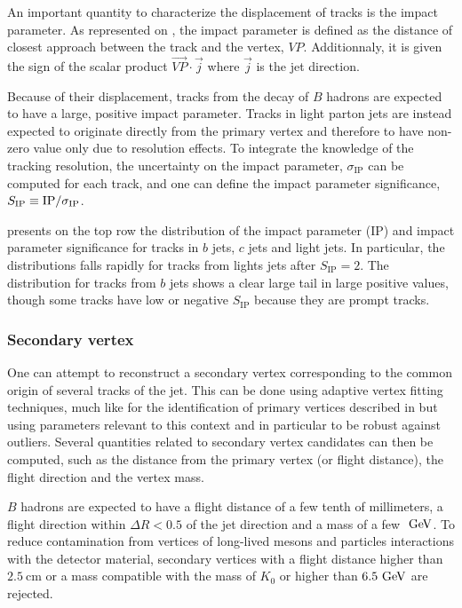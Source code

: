     An important quantity to characterize the displacement of tracks is the impact parameter.
    As represented on , the impact parameter is defined
    as the distance of closest approach between the track and the vertex, $VP$. Additionnaly,
    it is given the sign of the scalar product $\vec{VP} \cdot \vec{j}$ where $\vec{j}$ is
    the jet direction.

    Because of their displacement, tracks from the decay of $B$ hadrons are expected to
    have a large, positive impact parameter. Tracks in light parton jets are instead expected
    to originate directly from the primary vertex and therefore to have non-zero value
    only due to resolution effects. To integrate the knowledge of the tracking resolution,
    the uncertainty on the impact parameter, $\sigma_\text{IP}$ can be computed for each
    track, and one can define the impact parameter significance, $S_\text{IP} \equiv
    \text{IP}/\sigma_\text{IP}$.

     presents on the top row the distribution of the
    impact parameter (IP) and impact parameter significance for tracks in $b$ jets, $c$
    jets and light jets. In particular, the distributions falls rapidly for tracks from
    lights jets after $S_\text{IP} = 2$. The distribution for tracks from $b$ jets shows
    a clear large tail in large positive values, though some tracks have low or negative
    $S_\text{IP}$ because they are prompt tracks.

    \subsubsection{Secondary vertex}

    One can attempt to reconstruct a secondary vertex corresponding to the common origin
    of several tracks of the jet. This can be done using adaptive vertex fitting techniques,
    much like for the identification of primary vertices described in 
    but using parameters relevant to this context and in particular to be robust against
    outliers. Several quantities related to secondary vertex candidates can then be computed,
    such as the distance from the primary vertex (or flight distance), the flight direction
    and the vertex mass.

    $B$ hadrons are expected to have a flight distance of a few tenth of millimeters, a
    flight direction within $\Delta R < 0.5$ of the jet direction and a mass of a few $~\text{GeV}$.
    To reduce contamination from vertices of long-lived mesons and particles interactions with
    the detector material, secondary vertices with a flight distance higher than $2.5~\text{cm}$
    or a mass compatible with the mass of $K_0$ or higher than $6.5~\text{GeV}$ are rejected.

